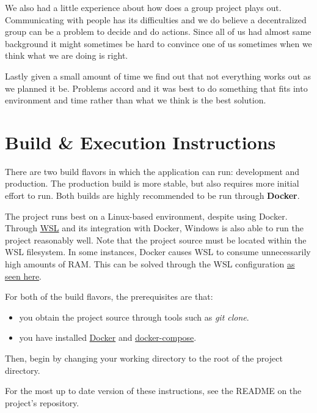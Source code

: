 \documentclass[a4paper, 12pt, titlepage]{article}
\begin{document}
  We also had a little experience about how does a group project plays out. 
  Communicating with people has its difficulties and we do believe a decentralized group can be a problem to decide and do actions. 
  Since all of us had almost same background it might sometimes be hard to convince one of us sometimes when we think what we are doing is right.
  
  Lastly given a small amount of time we find out that not everything works out as we planned it be. 
  Problems accord and it was best to do something that fits into environment and time rather than what we think is the best solution.
  
  \pagebreak
  \section{Build \& Execution Instructions}
  
  There are two build flavors in which the application can run: development and production.
  The production build is more stable, but also requires more initial effort to run.
  Both builds are highly recommended to be run through \textbf{Docker}.
  
  The project runs best on a Linux-based environment, despite using Docker. 
  Through \href{https://docs.microsoft.com/en-us/windows/wsl/about}{WSL} and its integration with Docker,
  Windows is also able to run the project reasonably well.
  Note that the project source must be located within the WSL filesystem.
  In some instances, Docker causes WSL to consume unnecessarily high amounts of RAM.
  This can be solved through the WSL configuration
  \href{https://github.com/microsoft/WSL/issues/4166\#issuecomment-526725261}{as seen here}.
  
  For both of the build flavors, the prerequisites are that:
  \begin{itemize}
    \item you obtain the project source through tools such as \textit{git clone}.
    \item you have installed \href{https://docs.docker.com/get-docker/}{Docker}
      and \href{https://docs.docker.com/compose/install/}{docker-compose}.
  \end{itemize}
  
  Then, begin by changing your working directory to the root of the project directory.
  
  For the most up to date version of these instructions, see the README on the project's repository.
  
\end{document}
